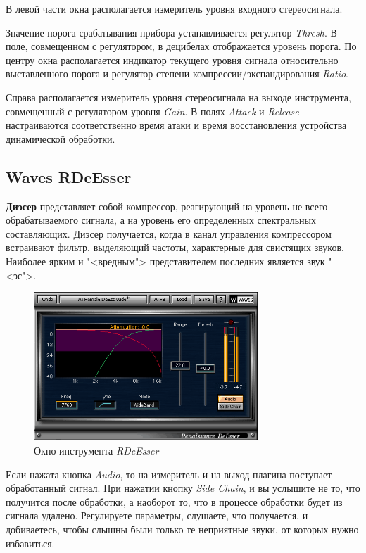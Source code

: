 \documentclass[oneside, final, 14pt]{extreport}
\begin{document}
В левой части окна располагается измеритель уровня входного стереосигнала. 

Значение порога срабатывания прибора устанавливается регулятор \emph{Thresh}. В поле, совмещенном с регулятором, в децибелах отображается уровень порога. По центру окна располагается индикатор текущего уровня сигнала относительно выставленного порога и регулятор степени компрессии/экспандирования \emph{Ratio}. 

Справа располагается измеритель уровня стереосигнала на выходе инструмента, совмещенный с регулятором уровня \emph{Gain}. В полях \emph{Attack} и \emph{Release} настраиваются соответственно время атаки и время восстановления устройства динамической обработки.

\subsection{Waves RDeEsser}
\textbf{Диэсер} представляет собой компрессор, реагирующий на уровень не всего обрабатываемого сигнала, а на уровень его определенных спектральных составляющих. Диэсер получается, когда в канал управления компрессором встраивают фильтр, выделяющий частоты, характерные для свистящих звуков. Наиболее ярким и "<вредным"> представителем последних является звук "<эс">.

\begin{figure}[ht!]
  \centering
  \includegraphics[width=0.75\textwidth]{pic-wavescomp-02}
  \caption{Окно инструмента \emph{RDeEsser}}
  \label{pic-wavescomp-02}
\end{figure}

Если нажата кнопка \emph{Audio}, то на измеритель и на выход плагина поступает обработанный сигнал. При нажатии кнопку \emph{Side Chain}, и вы услышите не то, что получится после обработки, а наоборот то, что в процессе обработки будет из сигнала удалено. Регулируете параметры, слушаете, что получается, и добиваетесь, чтобы слышны были только те неприятные звуки, от которых нужно избавиться. 
\end{document}

